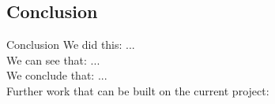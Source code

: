 \subsection{Conclusion}

\begin{frame}{Conclusion}{}
  We did this: ...\\
  We can see that: ... \\
  We conclude that: ... \\
  Further work that can be built on the current project:
\end{frame}